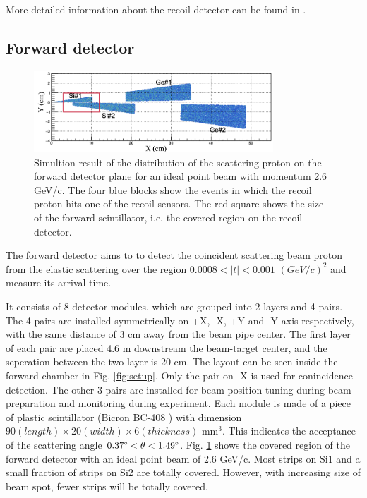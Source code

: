 \documentclass[number,5p]{elsarticle}
\begin{document}
More detailed information about the recoil detector can be found in \cite{recoil_article}.

\subsection{Forward detector}
\label{sec:fwd}

\begin{figure}[htbp]
\centering
\includegraphics[width=0.8\textwidth]{./fwd_acceptance.png}
\caption{Simultion result of the distribution of the scattering proton on
  the forward detector plane for an ideal point beam with momentum 2.6 GeV/c.
  The four blue blocks show the events in which the recoil proton hits one of the recoil sensors.
  The red square shows the size of the forward scintillator, i.e. the covered
  region on the recoil detector.}
\label{fig:forward_acceptance}
\end{figure}

The forward detector aims to to detect the coincident scattering beam proton
from the elastic scattering over the region \(0.0008 < |t| < 0.001\)
\((GeV/c)^2\) and measure its arrival time.

It consists of 8 detector modules, which are grouped into 2 layers and 4 pairs.
The 4 pairs are installed symmetrically on +X, -X, +Y and -Y axis respectively, with the same distance of 3
cm away from the beam pipe center.
The first layer of each pair are placed 4.6 m downstream the
beam-target center, and the seperation between the two layer is 20 cm.
The layout can be seen inside the forward chamber in Fig. \ref{fig:setup}.
Only the pair on -X is used for conincidence detection.
The other 3 pairs are installed for beam position tuning during beam preparation and monitoring during experiment.
Each module is made of a piece of plastic scintillator (Bicron BC-408
\cite{bc408}) with dimension \(90 (length) \times 20 (width) \times 6 (thickness)\) mm$^3$.
This indicates the acceptance of the scattering angle \(0.37\degree < \theta < 1.49\degree\).
Fig. \ref{fig:forward_acceptance} shows the covered region of the forward detector with an ideal point beam of 2.6 GeV/c.
Most strips on Si1 and a small fraction of strips on Si2 are totally covered. However, with increasing size of beam spot, fewer strips will be totally covered.
\end{document}
